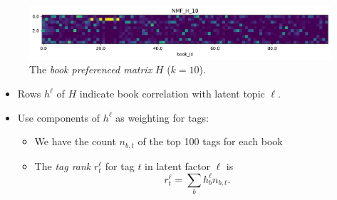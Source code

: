 \documentclass[handout]{beamer}
\begin{document}
\begin{frame}
 \begin{figure}[t]
    \centering
    \includegraphics[width=\textwidth, trim=3cm 0cm 0cm 0cm, clip]{../image/goodreads-models/nmf-H-10.png}
    \caption[NMF-H-10]{The \emph{book preferenced matrix} $H$ ($k=10$).}
     \label{fig:nmf-H-10}
\end{figure}

\vfill

\begin{itemize}[<+->]
\item Rows $h^\ell$ of $H$ indicate book correlation with latent topic $\ell$.\vfill
\item Use components of $h^\ell$ as weighting for tags:\vfill
\begin{itemize}[<+->]
\item We have the count $n_{b,t}$ of the top 100 tags for each book\vfill
\item The \emph{tag rank} $r^\ell_t$ for tag $t$ in latent factor $\ell$ is\vfill
\[r_t^\ell = \sum_{b} h^\ell_b n_{b,t}.\]
\end{itemize}
\end{itemize}

\vfill
\end{frame}
\end{document}
